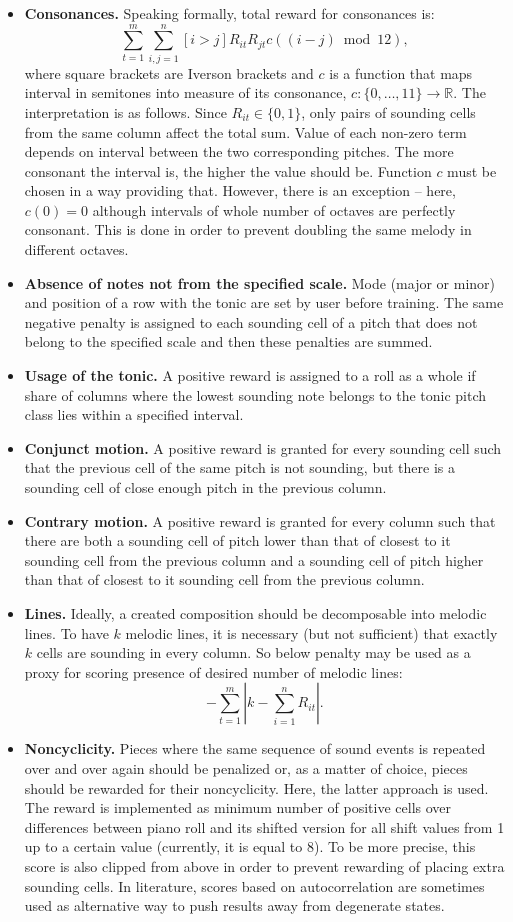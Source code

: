 \documentclass{article}
\begin{document}
\begin{itemize}
	\item \textbf{Consonances.} Speaking formally, total reward for consonances is:
	$$\sum_{t = 1}^m \sum_{i, j = 1}^n [i > j]R_{it} R_{jt} c((i - j) \bmod 12),$$
	where square brackets are Iverson brackets and $c$ is a function that maps interval in semitones into measure of its consonance, $c: \{0, \dots, 11\} \to \mathbb{R}$.
	The interpretation is as follows. Since $R_{it} \in \{0, 1\}$, only pairs of sounding cells from the same column affect the total sum. Value of each non-zero term depends on interval between the two corresponding pitches. The more consonant the interval is, the higher the value should be. Function $c$ must be chosen in a way providing that. However, there is an exception -- here, $c(0) = 0$ although intervals of whole number of octaves are perfectly consonant. This is done in order to prevent doubling the same melody in different octaves. 
	\item \textbf{Absence of notes not from the specified scale.} Mode (major or minor) and position of a row with the tonic are set by user before training. The same negative penalty is assigned to each sounding cell of a pitch that does not belong to the specified scale and then these penalties are summed.
	\item \textbf{Usage of the tonic.} A positive reward is assigned to a roll as a whole if share of columns where the lowest sounding note belongs to the tonic pitch class lies within a specified interval.  
	\item \textbf{Conjunct motion.} A positive reward is granted for every sounding cell such that the previous cell of the same pitch is not sounding, but there is a sounding cell of close enough pitch in the previous column.
	\item \textbf{Contrary motion.} A positive reward is granted for every column such that there are both a sounding cell of pitch lower than that of closest to it sounding cell from the previous column and a sounding cell of pitch higher than that of closest to it sounding cell from the previous column.
	\item \textbf{Lines.} Ideally, a created composition should be decomposable into melodic lines. To have $k$ melodic lines, it is necessary (but not sufficient) that exactly $k$ cells are sounding in every column. So below penalty may be used as a proxy for scoring presence of desired number of melodic lines:
	$$-\sum_{t = 1}^m \left| k - \sum_{i=1}^n R_{it} \right|.$$  
    \item \textbf{Noncyclicity.} Pieces where the same sequence of sound events is repeated over and over again should be penalized or, as a matter of choice, pieces should be rewarded for their noncyclicity. Here, the latter approach is used. The reward is implemented as minimum number of positive cells over differences between piano roll and its shifted version for all shift values from 1 up to a certain value (currently, it is equal to 8). To be more precise, this score is also clipped from above in order to prevent rewarding of placing extra sounding cells. In literature, scores based on autocorrelation are sometimes used as alternative way to push results away from degenerate states.

\end{itemize}
\end{document}
